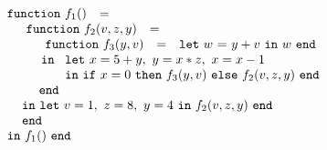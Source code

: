 \begin{equation}
\label{FunctionalConstructionProgram3}
\begin{array}{l}
  \begin{array}{lcl}\mathtt{function}\ f_1() & = & \end{array}\\
  \quad
   \begin{array}[t]{l} 
     \begin{array}{lcl}\mathtt{function}\ f_2(v,z,y) & = & \end{array}\\
     \quad \begin{array}{l}  
             \begin{array}{lcl}\mathtt{function}\ f_3(y,v) & = & \letin w {y+v} w\end{array}\\
             \, \mathtt{in}\
              \begin{array}[t]{l}
                \mathtt{let}\ x = {5+y},\
                              y = {x*z},\
                              x = {x-1}\\
                \mathtt{in}\ \ite {x=0} {\call {f_3} {y,v}} {\call {f_2} {v,z,y}}\ 
                 \mathtt{end} 
              \end{array}\\
             \mathtt{end}
           \end{array}\\
     \, \mathtt{in\ let}\ v = 1,\ z = 8,\ y = 4\ \mathtt{in}\ {\call {f_2} {v,z,y}}\ \mathtt{end}\\
     \, \mathtt{end}
   \end{array}\\
\begin{array}{lcl}
  \mathtt{in}\ f_1()\ \mathtt{end}
\end{array} 
\end{array}
\end{equation}

